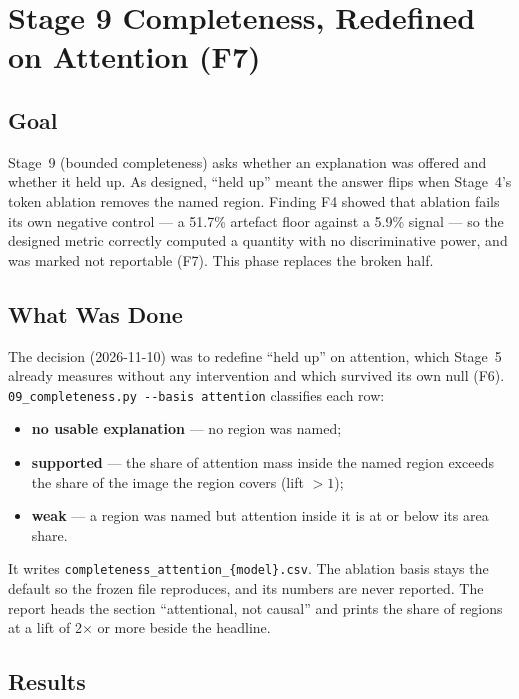 \chapter{Stage 9 Completeness, Redefined on Attention (F7)}
\label{chap:s2-3}

\section{Goal}

Stage~9 (bounded completeness) asks whether an explanation was offered and whether it held up. As designed,
``held up'' meant the answer flips when Stage~4's token ablation removes the named region. Finding F4 showed
that ablation fails its own negative control --- a 51.7\% artefact floor against a 5.9\% signal --- so the
designed metric correctly computed a quantity with no discriminative power, and was marked not reportable
(F7). This phase replaces the broken half.

\section{What Was Done}

The decision (2026-11-10) was to redefine ``held up'' on attention, which Stage~5 already measures without
any intervention and which survived its own null (F6). \texttt{09\_completeness.py -{}-basis attention}
classifies each row:

\begin{itemize}
\item \textbf{no usable explanation} --- no region was named;
\item \textbf{supported} --- the share of attention mass inside the named region exceeds the share of the
image the region covers (lift $>1$);
\item \textbf{weak} --- a region was named but attention inside it is at or below its area share.
\end{itemize}

It writes \texttt{completeness\_attention\_\{model\}.csv}. The ablation basis stays the default so the frozen
file reproduces, and its numbers are never reported. The report heads the section ``attentional, not
causal'' and prints the share of regions at a lift of 2$\times$ or more beside the headline.

\section{Results}

